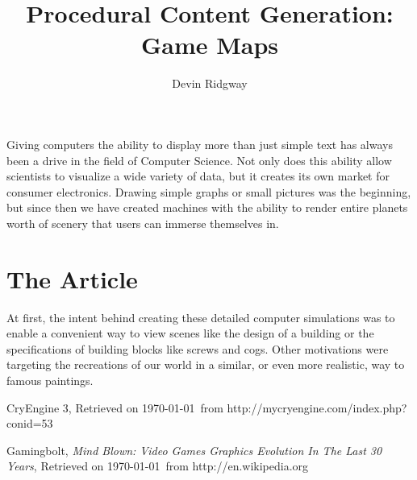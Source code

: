 \documentclass[12pt,a4paper]{report}
\title{Procedural Content Generation: Game Maps}
\author{Devin Ridgway}
\begin{document}
\maketitle

\tableofcontents

Giving computers the ability to display more than just simple text has always been a drive in the field of Computer Science. Not only does this ability allow scientists to visualize a wide variety of data, but it creates its own market for consumer electronics. Drawing simple graphs or small pictures was the beginning, but since then we have created machines with the ability to render entire planets worth of scenery that users can immerse themselves in.

\section{The Article}

At first, the intent behind creating these detailed computer simulations was to enable a convenient way to view scenes like the design of a building or the specifications of building blocks like screws and cogs. Other motivations were targeting the recreations of our world in a similar, or even more realistic, way to famous paintings.







\newpage
\begin{thebibliography}{2}

  CryEngine 3,
  Retrieved on \today\ from http://mycryengine.com/index.php?conid=53

  Gamingbolt,
  \emph{Mind Blown: Video Games Graphics Evolution In The Last 30 Years},
  Retrieved on \today\ from http://en.wikipedia.org

\end{thebibliography}
\end{document}
